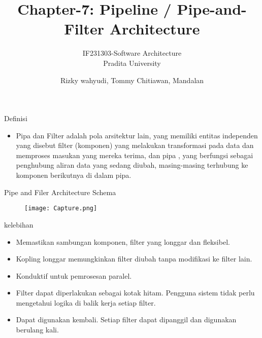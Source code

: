 \documentclass{beamer}
\title{Chapter-7: Pipeline / Pipe-and-Filter Architecture}
\subtitle{IF231303-Software Architecture\\Pradita University}
\author{Rizky wahyudi, Tommy Chitiawan, Mandalan}
\begin{document}
	\begin{frame}[plain]
		\maketitle
	\end{frame}

	\begin{frame}{Definisi}
		\begin{itemize}
	\item  Pipa dan Filter adalah pola arsitektur lain, yang memiliki entitas independen yang disebut filter (komponen) yang melakukan transformasi pada data dan memproses masukan yang mereka terima, dan pipa , yang berfungsi sebagai penghubung aliran data yang sedang diubah, masing-masing terhubung ke komponen berikutnya di dalam pipa.
\end{itemize}
\end{frame}

	\begin{frame}{Pipe and Filer Architecture Schema}
		\begin{figure}[h]
		\centering
		\texttt{[image: Capture.png]}
	\end{figure}
\end{frame}

\begin{frame}{kelebihan}
	\begin{itemize}
	\item Memastikan sambungan komponen, filter yang longgar dan fleksibel.
	\item Kopling longgar memungkinkan filter diubah tanpa modifikasi ke filter lain.
	\item Konduktif untuk pemrosesan paralel.
	\item Filter dapat diperlakukan sebagai kotak hitam. Pengguna sistem tidak perlu mengetahui logika di balik kerja setiap filter.
	\item Dapat digunakan kembali. Setiap filter dapat dipanggil dan digunakan berulang kali.
\end{itemize}
\end{frame}
\end{document}
